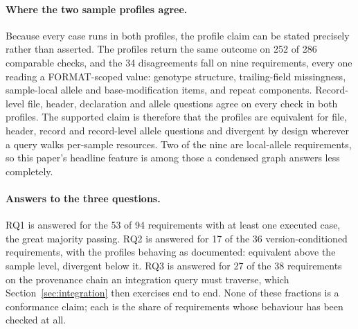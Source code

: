 \documentclass{ceurart}
\begin{document}
\paragraph{Where the two sample profiles agree.}
Because every case runs in both profiles, the profile claim can be stated precisely rather than asserted. 
The profiles return the same outcome on 252 of 286 comparable checks, and the 34 disagreements fall on nine requirements, every one reading a FORMAT-scoped value: genotype structure, trailing-field missingness, sample-local allele and base-modification items, and repeat components. 
Record-level file, header, declaration and allele questions agree on every check in both profiles. 
The supported claim is therefore that the profiles are equivalent for file, header, record and record-level allele questions and divergent by design wherever a query walks per-sample resources. 
Two of the nine are local-allele requirements, so this paper's headline feature is among those a condensed graph answers less completely.

\paragraph{Answers to the three questions.}
RQ1 is answered for the 53 of 94 requirements with at least one executed case, the great majority passing. 
RQ2 is answered for 17 of the 36 version-conditioned requirements, with the profiles behaving as documented: equivalent above the sample level, divergent below it. 
RQ3 is answered for 27 of the 38 requirements on the provenance chain an integration query must traverse, which Section~\ref{sec:integration} then exercises end to end. 
None of these fractions is a conformance claim; each is the share of requirements whose behaviour has been checked at all.
\end{document}
